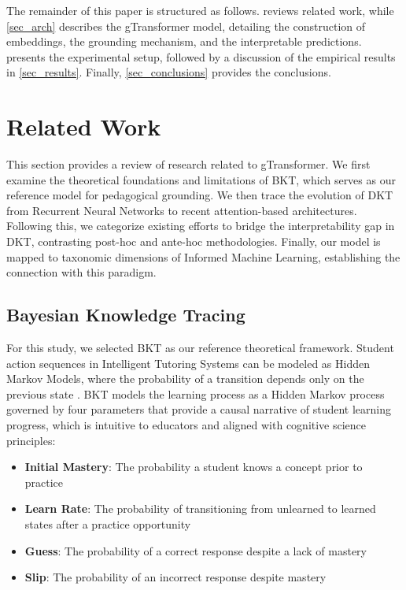 \documentclass[applsci,article,submit,moreauthors,pdftex]{Definitions/mdpi}
\begin{document}
The remainder of this paper is structured as follows.  reviews related work, while \cref{sec_arch} describes the gTransformer model, detailing the construction of embeddings, the grounding mechanism, and the interpretable predictions.  presents the experimental setup, followed by a discussion of the empirical results in \cref{sec_results}. Finally, \cref{sec_conclusions} provides the conclusions. 

\section{Related Work} \label{sec_related}

This section provides a review of research related to gTransformer. We first examine the theoretical foundations and limitations of BKT, which serves as our reference model for pedagogical grounding. We then trace the evolution of DKT from Recurrent Neural Networks to recent attention-based architectures. Following this, we categorize existing efforts to bridge the interpretability gap in DKT, contrasting post-hoc and ante-hoc methodologies. Finally, our model is mapped to taxonomic dimensions of Informed Machine Learning, establishing the connection with this paradigm. 


\subsection{Bayesian Knowledge Tracing} \label{sec_bkt}

For this study, we selected BKT \citep{corbett1994knowledge} as our reference theoretical framework. Student action sequences in Intelligent Tutoring Systems can be modeled as Hidden Markov Models, where the probability of a transition depends only on the previous state \citep{Arnau-Gonzalez2025195}. BKT models the learning process as a Hidden Markov process governed by four parameters that provide a causal narrative of student learning progress, which is intuitive to educators and aligned with cognitive science principles:

\begin{itemize}
    \item \textbf{Initial Mastery}: The probability a student knows a concept prior to practice 
    \item \textbf{Learn Rate}: The probability of transitioning from unlearned to learned states after a practice opportunity
    \item \textbf{Guess}: The probability of a correct response despite a lack of mastery
    \item \textbf{Slip}: The probability of an incorrect response despite mastery 
\end{itemize}
\end{document}
